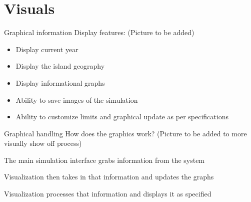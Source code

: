 \section{Visuals}


\begin{frame}{Graphical information}
    Display features:          (Picture to be added)
    \begin{itemize}[<+->]
        \item Display current year
        \item Display the island geography
        \item Display informational graphs
        \item Ability to save images of the simulation
        \item Ability to customize limits
        and graphical update as per specifications
    \end{itemize}
\end{frame}

\begin{frame}{Graphical handling}
    How does the graphics work?         (Picture to be added to more visually show off process)

    \pause The main simulation interface grabs information from the system

    \pause Visualization then takes in that information and updates the graphs

    \pause Visualization processes that information and displays it as specified

\end{frame}